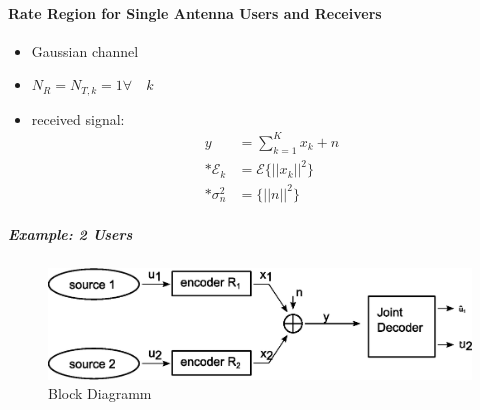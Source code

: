 \documentclass[a4paper, 10pt]{article}
\begin{document}
\paragraph{Rate Region for Single Antenna Users and Receivers}
\begin{itemize}
	\item Gaussian channel
	\item $N_R = N_{T,k} = 1 \forall\quad k $
	\item received signal: 
	\begin{align*}
		y &= \sum\limits_{k = 1}^{K}x_k + n\\ * \mathcal{E}_k &= \mathcal{E}\bigl\{||x_k||^2\bigr\} \\ *\sigma_n^2 &= \bigl\{||n||^2\bigr\}
	\end{align*}
\end{itemize}
\subparagraph*{Example: 2 Users}
\begin{figure}[h]
	\centering
	\includegraphics[scale=0.6]{Rate_Region_Example}
	\caption{Block Diagramm}
	\label{fig:Rate_Region_Example}
\end{figure}
\end{document}
